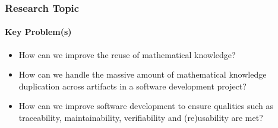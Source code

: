 \documentclass{beamer}
\begin{document}
%
%


\begin{frame}

\frametitle{Research Topic}
\framesubtitle{Key Problem(s)}




	\begin{itemize}
	\item How can we improve the reuse of mathematical knowledge?


	\item How can we handle the massive amount of mathematical knowledge 
					duplication across artifacts in a software development project?

	
	\item How can we improve software development to ensure qualities such as
					traceability, maintainability, verifiability and (re)usability are met?
	\end{itemize}



\end{frame}
\end{document}

